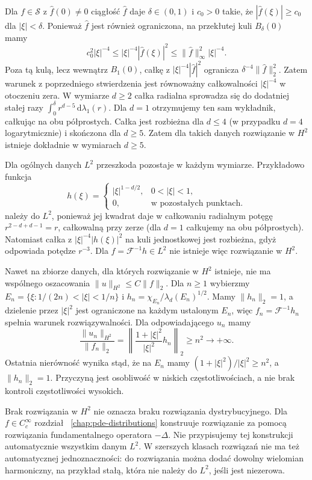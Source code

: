 \begin{uwaga}[Dlaczego przypadek $a=0$ jest inny?]
Dla $f\in\mathcal S$ z $\widehat f(0)\ne0$
ciągłość $\widehat f$ daje $\delta\in(0,1)$
i $c_0>0$ takie, że
$|\widehat f(\xi)|\ge c_0$ dla $|\xi|<\delta$.
Ponieważ $\widehat f$ jest również ograniczona,
na przekłutej kuli $B_\delta(0)$ mamy
\[
 c_0^2|\xi|^{-4}\le|\xi|^{-4}|\widehat f(\xi)|^2
 \le\|\widehat f\|_\infty^2|\xi|^{-4}.
\]
Poza tą kulą, lecz wewnątrz $B_1(0)$,
całkę z $|\xi|^{-4}|\widehat f|^2$
ogranicza $\delta^{-4}\|\widehat f\|_2^2$.
Zatem warunek z poprzedniego stwierdzenia
jest równoważny całkowalności $|\xi|^{-4}$
w otoczeniu zera.
W wymiarze $d\ge2$ całka radialna sprowadza się
do dodatniej stałej razy
$\int_0^\delta r^{d-5}\,\mathrm d\lambda_1(r)$.
Dla $d=1$ otrzymujemy ten sam wykładnik,
całkując na obu półprostych.
Całka jest rozbieżna dla $d\le4$
(w przypadku $d=4$ logarytmicznie)
i skończona dla $d\ge5$.
Zatem dla takich danych rozwiązanie w $H^2$
istnieje dokładnie w wymiarach $d\ge5$.

Dla ogólnych danych $L^2$ przeszkoda pozostaje
w każdym wymiarze. Przykładowo funkcja
\[
 h(\xi)=
 \begin{cases}
 |\xi|^{1-d/2},&0<|\xi|<1,\\
 0,&\text{w pozostałych punktach}.
 \end{cases}
\]
należy do $L^2$, ponieważ jej kwadrat daje
w całkowaniu radialnym potęgę
$r^{2-d+d-1}=r$, całkowalną przy zerze
(dla $d=1$ całkujemy na obu półprostych).
Natomiast całka z $|\xi|^{-4}|h(\xi)|^2$
na kuli jednostkowej jest rozbieżna,
gdyż odpowiada potędze $r^{-3}$.
Dla $f=\mathcal F^{-1}h\in L^2$
nie istnieje więc rozwiązanie w $H^2$.

Nawet na zbiorze danych, dla których rozwiązanie
w $H^2$ istnieje, nie ma wspólnego oszacowania
$\|u\|_{H^2}\le C\|f\|_2$.
Dla $n\ge1$ wybierzmy
$E_n=\{\xi:1/(2n)<|\xi|<1/n\}$
i $h_n=\chi_{E_n}/\lambda_d(E_n)^{1/2}$.
Mamy $\|h_n\|_2=1$, a dzielenie przez $|\xi|^2$
jest ograniczone na każdym ustalonym $E_n$,
więc $f_n=\mathcal F^{-1}h_n$ spełnia warunek
rozwiązywalności. Dla odpowiadającego $u_n$ mamy
\[
 \frac{\|u_n\|_{H^2}}{\|f_n\|_2}
 =\left\|\frac{1+|\xi|^2}{|\xi|^2}h_n\right\|_2
 \ge n^2\longrightarrow+\infty.
\]
Ostatnia nierówność wynika stąd, że na $E_n$
mamy $(1+|\xi|^2)/|\xi|^2\ge n^2$,
a $\|h_n\|_2=1$.
Przyczyną jest osobliwość w niskich
częstotliwościach, a nie brak kontroli
częstotliwości wysokich.

Brak rozwiązania w $H^2$ nie oznacza braku
rozwiązania dystrybucyjnego. Dla
$f\in C_c^\infty$ rozdział
~\ref{chap:pde-distributions} konstruuje
rozwiązanie za pomocą rozwiązania fundamentalnego
operatora $-\Delta$. Nie przypisujemy tej
konstrukcji automatycznie wszystkim danym $L^2$.
W szerszych klasach rozwiązań nie ma też
automatycznej jednoznaczności: do rozwiązania
można dodać dowolny wielomian harmoniczny,
na przykład stałą, która nie należy do $L^2$,
jeśli jest niezerowa.
\end{uwaga}

